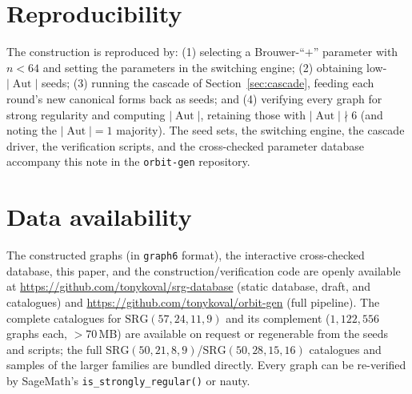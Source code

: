 \documentclass[11pt]{article}
\theoremstyle{definition}
\newcommand{\SRG}[1]{\mathrm{SRG}(#1)}
\newcommand{\Aut}{\operatorname{Aut}}
\begin{document}
\appendix
\section{Reproducibility}\label{app:repro}

The construction is reproduced by: (1) selecting a Brouwer-``$+$'' parameter with $n<64$
and setting the parameters in the switching engine; (2) obtaining low-$|\Aut|$ seeds; (3)
running the cascade of Section~\ref{sec:cascade}, feeding each round's new canonical forms
back as seeds; and (4) verifying every graph for strong regularity and computing $|\Aut|$,
retaining those with $|\Aut|\nmid 6$ (and noting the $|\Aut|=1$ majority). The seed sets,
the switching engine, the cascade driver, the verification scripts, and the cross-checked
parameter database accompany this note in the \texttt{orbit-gen} repository.

\section*{Data availability}
The constructed graphs (in \texttt{graph6} format), the interactive cross-checked database,
this paper, and the construction/verification code are openly available at
\url{https://github.com/tonykoval/srg-database} (static database, draft, and catalogues) and
\url{https://github.com/tonykoval/orbit-gen} (full pipeline). The complete catalogues for
$\SRG{57,24,11,9}$ and its complement ($1{,}122{,}556$ graphs each, $>70$\,MB) are available
on request or regenerable from the seeds and scripts; the full $\SRG{50,21,8,9}$/$\SRG{50,28,15,16}$
catalogues and samples of the larger families are bundled directly. Every graph can be
re-verified by SageMath's \texttt{is\_strongly\_regular()} or nauty.
\end{document}
